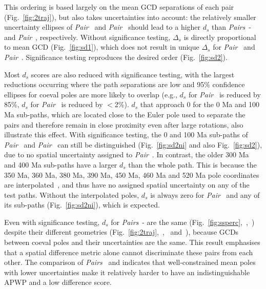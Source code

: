 This ordering is based largely on the mean GCD separations of each pair
(Fig.~\ref{fig:2traj}), but also takes uncertainties into account: the
relatively smaller uncertainty ellipses of
\emph{Pair}~\textbf{} and
\emph{Pair}~\textbf{} should lead to a higher $d_s$ than
\emph{Pairs}~\textbf{}-\textbf{} and
\emph{Pair}~\textbf{}, respectively. Without significance
testing, $\Delta_s$ is directly proportional to mean GCD (Fig.~\ref{fig:sd1}),
which does not result in unique $\Delta_s$ for
\emph{Pair}~\textbf{} and
\emph{Pair}~\textbf{}. Significance testing reproduces the
desired order (Fig.~\ref{fig:sd2}).

Most $d_s$ scores are also reduced with significance testing, with the largest
reductions occurring where the path separations are low and 95\% confidence
ellipses for coeval poles are more likely to overlap (e.g., $d_s$ for
\emph{Pair}~\textbf{} is reduced by 85\%, $d_s$ for
\emph{Pair}~\textbf{} is reduced by $<$2\%). $d_s$ that
approach 0 for the 0 Ma and 100 Ma sub-paths, which
are located close to the Euler pole used to separate the pairs and therefore
remain in close proximity even after large rotations, also illustrate this
effect. With significance testing, the 0 and 100 Ma
sub-paths of \emph{Pair}~\textbf{} and
\emph{Pair}~\textbf{} can still be distinguished
(Fig.~\ref{fig:sd2ni} and also Fig.~\ref{fig:sd2}), due to no spatial
uncertainty assigned to \emph{Pair}~\textbf{}. In contrast,
the older 300 Ma and 400 Ma sub-paths have a larger
$d_s$ than the whole path. This is because the 350 Ma, 360 Ma, 380 Ma, 390 Ma,
450 Ma, 460 Ma and 520 Ma pole coordinates are interpolated~\citep{T12}, and
thus have no assigned spatial uncertainty on any of the test paths. Without the
interpolated poles, $d_s$ is always zero for
\emph{Pair}~\textbf{} and any of its sub-paths
(Fig.~\ref{fig:sd2ni}), which is expected.

Even with significance testing, $d_s$ for
\emph{Pairs}~\textbf{}-\textbf{} are the
same (Fig.~\ref{fig:ssperc},~,~) despite their different
geometries (Fig.~\ref{fig:2traj},~,~
and~), because GCDs between coeval poles and their
uncertainties are the same. This result emphasises that a spatial difference
metric alone cannot discriminate these pairs from each other. The comparison of
\emph{Pairs}~\textbf{} and \textbf{}
indicates that well-constrained mean poles with lower uncertainties make it
relatively harder to have an indistinguishable APWP and a low difference score.

